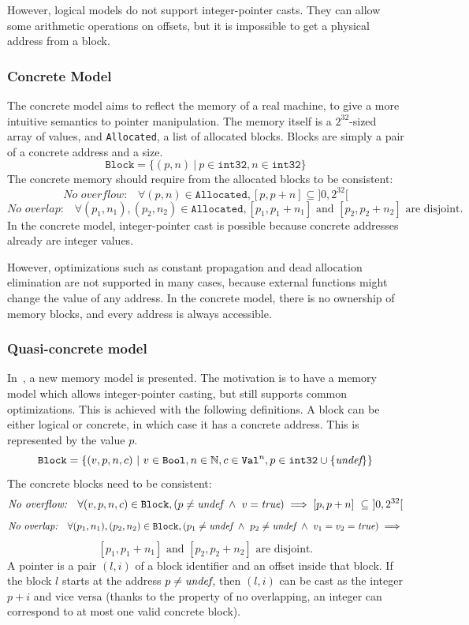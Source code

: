 However, logical models do not support integer-pointer casts. They can allow some arithmetic operations on offsets, but it is impossible to get a physical address from a block.

\subsubsection{Concrete Model}
The concrete model aims to reflect the memory of a real machine, to give a more intuitive semantics to pointer manipulation. 
The memory itself is a $2^{32}$-sized array of values, and \texttt{Allocated}, a list of allocated blocks.
Blocks are simply a pair of a concrete address and a size.
$$\texttt{Block}=\{(p,n)~|~p\in\texttt{int32},n\in\texttt{int32}\}$$
The concrete memory should require from the allocated blocks to be consistent:
$$\textit{No overflow:}\quad\forall (p,n)\in\texttt{Allocated}, [p,p+n]\subseteq]0,2^{32}[$$
$$\textit{No overlap:}\quad\forall (p_1,n_1), (p_2,n_2)\in\texttt{Allocated}, [p_1,p_1+n_1]\text{ and }[p_2,p_2+n_2]\text{ are disjoint.}$$
In the concrete model, integer-pointer cast is possible because concrete addresses already are integer values.

However, optimizations such as constant propagation and dead allocation elimination are not supported in many cases, because external functions might change the value of any address. In the concrete model, there is no ownership of memory blocks, and every address is always accessible.
\subsubsection{Quasi-concrete model}
In~\cite{DBLP:conf/pldi/KangHMGZV15}, a new memory model is presented. The motivation is to have a memory model which allows integer-pointer casting, but still supports common optimizations.
This is achieved with the following definitions.
A block can be either logical or concrete, in which case it has a concrete address. This is represented by the value $p$.
$$\texttt{Block}=\{(v,p,n,c)~|~v\in\texttt{Bool},n\in\mathbb{N},c\in\texttt{Val}^{n},p\in\texttt{int32}\cup\{\textit{undef}\}\}$$
The concrete blocks need to be consistent:
$$\textit{No overflow:}\quad\forall (v,p,n,c)\in\texttt{Block}, (p\neq\textit{undef}~\wedge~ v=\textit{true})\implies[p,p+n]~\subseteq~]0,2^{32}[$$
$$\textit{No overlap:}\quad\forall (p_1,n_1), (p_2,n_2)\in\texttt{Block}, (p_1\neq\textit{undef}~\wedge~p_2\neq\textit{undef} ~\wedge~ v_1=v_2=\textit{true})\implies$$ $$[p_1,p_1+n_1]\text{ and }[p_2,p_2+n_2]\text{ are disjoint.}$$
A pointer is a pair $(l,i)$ of a block identifier and an offset inside that block. If the block $l$ starts at the address $p\neq\textit{undef}$, then $(l,i)$ can be cast as the integer $p+i$ and vice versa (thanks to the property of no overlapping, an integer can correspond to at most one valid concrete block).


